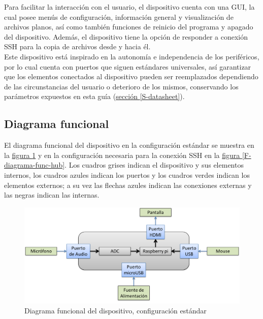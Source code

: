 \documentclass[11pt,lettersize]{article} %
\newcommand{\figura}[1]{\hyperref[{#1}]{figura \ref*{#1}}}
\newcommand{\seccion}[1]{\hyperref[{#1}]{sección \ref*{#1}}}
\begin{document}
Para facilitar la interacción con el usuario, el dispositivo cuenta con una GUI, la cual posee menús de configuración, información general y visualización de archivos planos, así como también funciones de reinicio del programa y apagado del dispositivo. Además, el dispositivo tiene la opción de responder a conexión SSH para la copia de archivos desde y hacia él. \\

Este dispositivo está inspirado en la autonomía e independencia de los periféricos, por lo cual cuenta con puertos que siguen estándares universales, así garantizar que los elementos conectados al dispositivo pueden ser reemplazados dependiendo de las circunstancias del usuario o deterioro de los mismos, conservando los parámetros expuestos en esta guía (\seccion{S-datasheet}).


\subsection{Diagrama funcional}
El diagrama funcional del dispositivo en la configuración estándar se muestra en la \figura{F-diagrama-func} y en la configuración necesaria para la conexión SSH en la \figura{F-diagrama-func-hub}. Los cuadros grises indican el dispositivo y sus elementos internos, los cuadros azules indican los puertos y los cuadros verdes indican los elementos externos; a su vez las flechas azules indican las conexiones externas y las negras indican las internas.
\begin{figure}[h!]
	\centering
	\includegraphics[width=.9\textwidth]{images/diagrama-funcional.png}
	\caption{Diagrama funcional del dispositivo, configuración estándar}
	\label{F-diagrama-func}
\end{figure}
\end{document}
